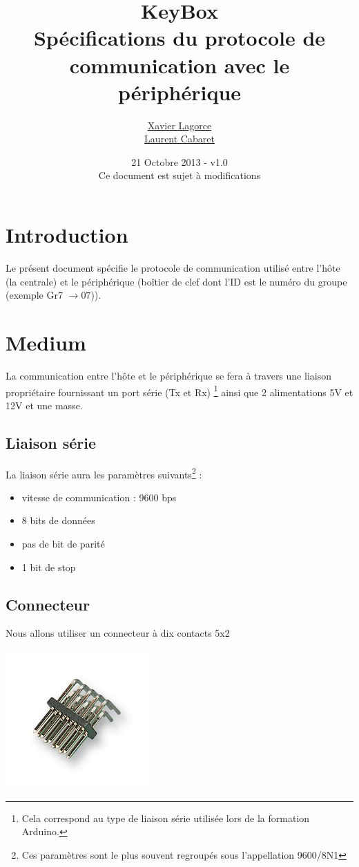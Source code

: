 \documentclass[a4paper, 10pt]{article} %
\title{{\huge KeyBox}\vspace{0.5cm}\\Spécifications du protocole de communication avec le périphérique}
\author{\href{mailto:Xavier.Lagorce@crans.org}{Xavier Lagorce}\\\href{mailto:laurent.cabaret@ecp.fr}{Laurent Cabaret}}
\date{21 Octobre 2013 - v1.0\\Ce document est sujet à modifications}
\newcommand{\saut}{\vspace{0.5cm}}
\begin{document}
\maketitle

\vspace{1cm}

\tableofcontents
\newpage

\section{Introduction}

Le présent document spécifie le protocole de communication utilisé entre l'hôte (la centrale)
et le périphérique (boîtier de clef dont l'ID est le numéro du groupe (exemple Gr7 $\longrightarrow 07$)).

\section{Medium}

La communication entre l'hôte et le périphérique se fera à travers une liaison propriétaire fournissant un port série (Tx et Rx) \footnote{Cela correspond au type de liaison série utilisée lors de la formation Arduino.} ainsi que 2 alimentations 5V et 12V et une masse.

\saut

\subsection{Liaison série}
La liaison série aura les paramètres suivants\footnote{Ces paramètres sont le plus souvent regroupés
sous l'appellation 9600/8N1} :
\begin{itemize}
  \item vitesse de communication : 9600 bps
  \item 8 bits de données
  \item pas de bit de parité
  \item 1 bit de stop
\end{itemize}

\subsection{Connecteur}

Nous allons utiliser un connecteur à dix contacts 5x2 

\begin{center}
\includegraphics[scale=0.5]{HE10.jpg}
\end{center}
\end{document}
